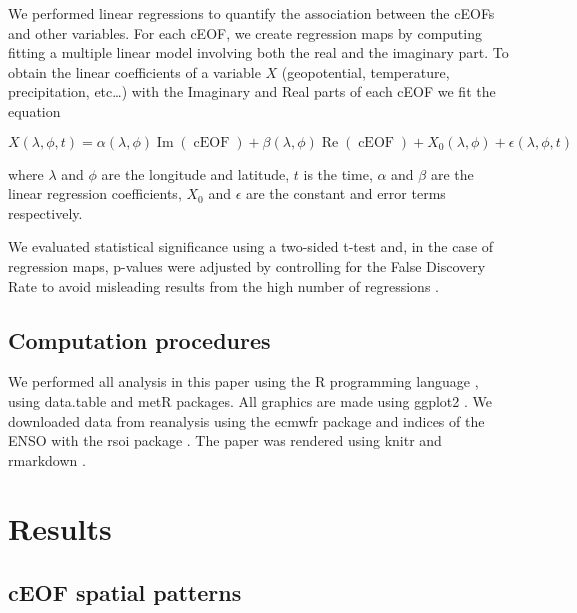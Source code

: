 \documentclass[smallextended]{svjour3}       %
\begin{document}
We performed linear regressions to quantify the association between the cEOFs and other variables.
For each cEOF, we create regression maps by computing fitting a multiple linear model involving both the real and the imaginary part.
To obtain the linear coefficients of a variable \(X\) (geopotential, temperature, precipitation, etc\ldots) with the Imaginary and Real parts of each cEOF we fit the equation

\[
X(\lambda, \phi, t) = \alpha(\lambda, \phi) \operatorname{Im}(\operatorname{cEOF}) + \beta(\lambda, \phi) \operatorname{Re}(\operatorname{cEOF}) + X_0(\lambda, \phi) +  \epsilon(\lambda, \phi, t)
\]

where \(\lambda\) and \(\phi\) are the longitude and latitude, \(t\) is the time, \(\alpha\) and \(\beta\) are the linear regression coefficients, \(X_0\) and \(\epsilon\) are the constant and error terms respectively.

We evaluated statistical significance using a two-sided t-test and, in the case of regression maps, p-values were adjusted by controlling for the False Discovery Rate \citep{benjamini1995, wilks2016} to avoid misleading results from the high number of regressions \citep{walker1914, katz1991}.

\hypertarget{computation-procedures}{%
\subsection{Computation procedures}\label{computation-procedures}}

We performed all analysis in this paper using the R programming language \citep{rcoreteam2020}, using data.table \citep{dowle2020} and metR \citep{campitelli2020} packages.
All graphics are made using ggplot2 \citep{wickham2009}.
We downloaded data from reanalysis using the ecmwfr package \citep{hufkens2020} and indices of the ENSO with the rsoi package \citep{albers2020}.
The paper was rendered using knitr and rmarkdown \citep{xie2015, allaire2019}.

\hypertarget{results}{%
\section{Results}\label{results}}

\hypertarget{spatial}{%
\subsection{cEOF spatial patterns}\label{spatial}}
\end{document}
